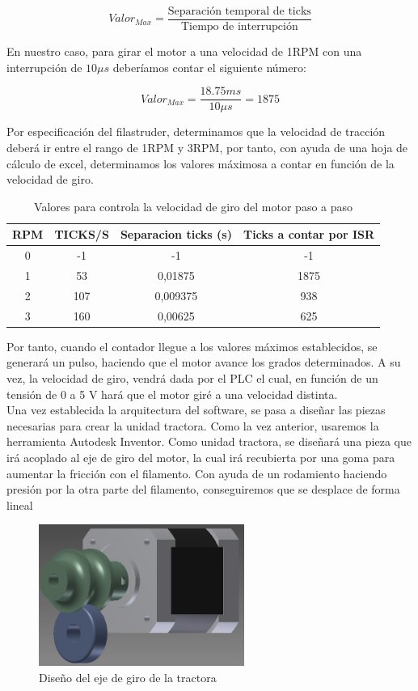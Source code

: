 $$ Valor_{Max} = \frac{\text{Separación temporal de ticks}}{\text{Tiempo de interrupción}}$$

En nuestro caso, para girar el motor a una velocidad de 1RPM con una interrupción de $10\mu s$ deberíamos contar el siguiente número:

$$Valor_{Max} = \frac{18.75 ms}{10\mu s} = 1875$$

Por especificación del filastruder, determinamos que la velocidad de tracción deberá ir entre el rango de 1RPM y 3RPM, por tanto, con ayuda de una hoja de cálculo de excel, determinamos los valores máximosa a contar en función de la velocidad de giro.

\begin{table}[H]
\centering
\begin{tabular}{cccc}
\multicolumn{1}{l}{{\bf RPM}} & \multicolumn{1}{l}{{\bf TICKS/S}} & \multicolumn{1}{l}{{\bf Separacion ticks (s)}} & \multicolumn{1}{l}{{\bf Ticks a contar por ISR}} \\
\hline
0 & -1 & -1 & -1 \\
1 & 53 & 0,01875 & 1875 \\
2 & 107 & 0,009375 & 938 \\
3 & 160 & 0,00625 & 625
\end{tabular}
\caption{Valores para controla la velocidad de giro del motor paso a paso}
\label{tab:valores_paso_paso}
\end{table}

Por tanto, cuando el contador llegue a los valores máximos establecidos, se generará un pulso, haciendo que el motor avance los grados determinados. A su vez, la velocidad de giro, vendrá dada por el PLC el cual, en función de un tensión de 0 a 5 V hará que el motor giré a una velocidad distinta.\\

Una vez establecida la arquitectura del software, se pasa a diseñar las piezas necesarias para crear la unidad tractora. Como la vez anterior, usaremos la herramienta Autodesk Inventor. Como unidad tractora, se diseñará una pieza que irá acoplado al eje de giro del motor, la cual irá recubierta por una goma para aumentar la fricción con el filamento. Con ayuda de un rodamiento haciendo presión por la otra parte del filamento, conseguiremos que se desplace de forma lineal

	\begin{figure}[H]
            \centering
            \includegraphics[width=0.6\textwidth]{images/producciones/tractora/motor.png}
            \caption{Diseño del eje de giro de la tractora}
            \label{fig:tractora}
    \end{figure}



